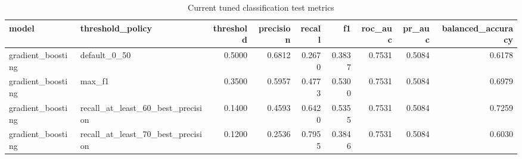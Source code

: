 \begin{table}
\centering
\caption{Current tuned classification test metrics}
\label{tab:classification-metrics}
\begin{tabular}{llrrrrrrr}
\toprule
            model &                  threshold\_policy &  threshold &  precision &  recall &     f1 &  roc\_auc &  pr\_auc &  balanced\_accuracy \\
\midrule
gradient\_boosting &                      default\_0\_50 &     0.5000 &     0.6812 &  0.2670 & 0.3837 &   0.7531 &  0.5084 &             0.6178 \\
gradient\_boosting &                            max\_f1 &     0.3500 &     0.5957 &  0.4773 & 0.5300 &   0.7531 &  0.5084 &             0.6979 \\
gradient\_boosting & recall\_at\_least\_60\_best\_precision &     0.1400 &     0.4593 &  0.6420 & 0.5355 &   0.7531 &  0.5084 &             0.7259 \\
gradient\_boosting & recall\_at\_least\_70\_best\_precision &     0.1200 &     0.2536 &  0.7955 & 0.3846 &   0.7531 &  0.5084 &             0.6030 \\
\bottomrule
\end{tabular}
\end{table}
